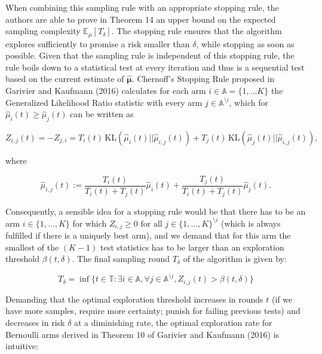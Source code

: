\documentclass[11pt,]{article}
\newcommand{\KL}{\,\text{KL}}
\begin{document}
When combining this sampling rule with an appropriate stopping rule, the
authors are able to prove in Theorem 14 an upper bound on the expected
sampling complexity \(\mathbb{E}_{\mu}[T_{\delta}]\). The stopping rule
ensures that the algorithm explores sufficiently to promise a risk
smaller than \(\delta\), while stopping as soon as possible. Given that
the sampling rule is independent of this stopping rule, the rule boils
down to a statistical test at every iteration and thus is a sequential
test based on the current estimate of \(\hat{\bm{\mu}}\). Chernoff's
Stopping Rule proposed in Garivier and Kaufmann (2016) calculates for
each arm \(i\in \mathbb{A} = \{1,...K\}\) the Generalized Likelihood
Ratio statistic with every arm \(j \in \mathbb{A}^{\setminus i}\), which
for \(\hat{\mu}_i(t) \geq \hat{\mu}_j(t)\) can be written as

\begin{equation*}
Z_{i,j}(t) = - Z_{j,i} = T_i(t) \KL(\hat{\mu}_i(t) || \hat{\mu}_{i,j}(t)) + T_j(t) \KL(\hat{\mu}_{j}(t) || \hat{\mu}_{i,j}(t)),
\end{equation*}

where

\begin{equation*}
\hat{\mu}_{i,j}(t) := \frac{T_i(t)}{T_i(t) + T_j(t)}\hat{\mu}_i(t) + \frac{T_j(t)}{T_i(t) + T_j(t)}\hat{\mu}_j(t).
\end{equation*}

Consequently, a sensible idea for a stopping rule would be that there
has to be an arm \(i \in \{1,...,K\}\) for which
\(Z_{i,j} \geq 0 \text{ for all } j \in \{1,...,K\}^{\setminus i}\)
(which is always fulfilled if there is a uniquely best arm), and we
demand that for this arm the smallest of the \((K-1)\) test statistics
has to be larger than an exploration threshold \(\beta(t, \delta)\). The
final sampling round \(T_{\delta}\) of the algorithm is given by:

\begin{equation*}
T_{\delta} = \inf \{t \in \mathbb{T}: \exists i \in \mathbb{A}, \forall j\in \mathbb{A}^{\setminus i}, Z_{i,j}(t) > \beta(t, \delta)\}
\end{equation*}

Demanding that the optimal exploration threshold increases in rounds
\(t\) (if we have more samples, require more certainty; punish for
failing previous tests) and decreases in risk \(\delta\) at a
diminishing rate, the optimal exploration rate for Bernoulli arms
derived in Theorem 10 of Garivier and Kaufmann (2016) is intuitive:
\end{document}
